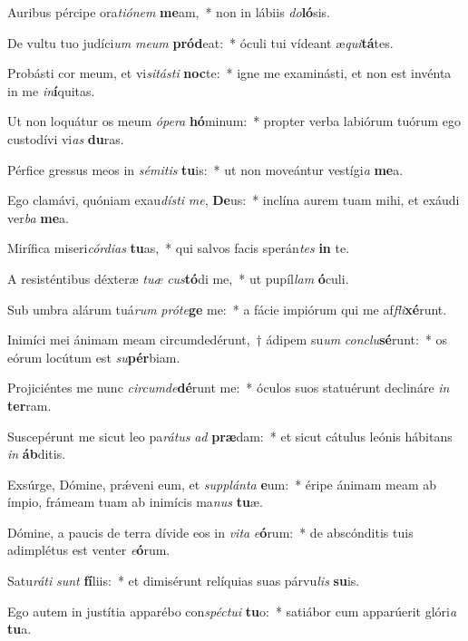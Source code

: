 \item Auribus pércipe ora\textit{ti}\textit{ó}\textit{nem} \textbf{me}am,~* non in lábiis \textit{do}\textbf{ló}sis.
\item De vultu tuo judíci\textit{um} \textit{me}\textit{um} \textbf{pród}eat:~* óculi tui vídeant æ\textit{qui}\textbf{tá}tes.
\item Probásti cor meum, et vi\textit{si}\textit{tás}\textit{ti} \textbf{noc}te:~* igne me examinásti, et non est invénta in me \textit{in}\textbf{í}quitas.
\item Ut non loquátur os meum \textit{ó}\textit{pe}\textit{ra} \textbf{hó}minum:~* propter verba labiórum tuórum ego custodívi vi\textit{as} \textbf{du}ras.
\item Pérfice gressus meos in \textit{sé}\textit{mi}\textit{tis} \textbf{tu}is:~* ut non moveántur vestígi\textit{a} \textbf{me}a.
\item Ego clamávi, quóniam exau\textit{dís}\textit{ti} \textit{me}, \textbf{De}us:~* inclína aurem tuam mihi, et exáudi ver\textit{ba} \textbf{me}a.
\item Mirífica miseri\textit{cór}\textit{di}\textit{as} \textbf{tu}as,~* qui salvos facis sperán\textit{tes} \textbf{in} te.
\item A resisténtibus déxteræ \textit{tu}\textit{æ} \textit{cus}\textbf{tó}di me,~* ut pupíl\textit{lam} \textbf{ó}culi.
\item Sub umbra alárum tuá\textit{rum} \textit{pró}\textit{te}\textbf{ge} me:~* a fácie impiórum qui me af\textit{fli}\textbf{xé}runt.
\item Inimíci mei ánimam meam circumdedérunt,~† ádipem su\textit{um} \textit{con}\textit{clu}\textbf{sé}runt:~* os eórum locútum est \textit{su}\textbf{pér}biam.
\item Projiciéntes me nunc \textit{cir}\textit{cum}\textit{de}\textbf{dé}runt me:~* óculos suos statuérunt declináre \textit{in} \textbf{ter}ram.
\item Suscepérunt me sicut leo pa\textit{rá}\textit{tus} \textit{ad} \textbf{præ}dam:~* et sicut cátulus leónis hábitans \textit{in} \textbf{áb}ditis.
\item Exsúrge, Dómine, prǽveni eum, et \textit{sup}\textit{plán}\textit{ta} \textbf{e}um:~* éripe ánimam meam ab ímpio, frámeam tuam ab inimícis ma\textit{nus} \textbf{tu}æ.
\item Dómine, a paucis de terra dívide eos in \textit{vi}\textit{ta} \textit{e}\textbf{ó}rum:~* de abscónditis tuis adimplétus est venter \textit{e}\textbf{ó}rum.
\item Satu\textit{rá}\textit{ti} \textit{sunt} \textbf{fí}liis:~* et dimisérunt relíquias suas párvu\textit{lis} \textbf{su}is.
\item Ego autem in justítia apparébo con\textit{spéc}\textit{tu}\textit{i} \textbf{tu}o:~* satiábor cum apparúerit glóri\textit{a} \textbf{tu}a.
